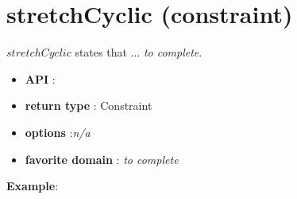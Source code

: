 \label{stretchcyclic}
\hypertarget{stretchcyclic}{}

\section{stretchCyclic (constraint)}\label{stretchcyclic:stretchcyclicconstraint}\hypertarget{stretchcyclic:stretchcyclicconstraint}{}
\(stretchCyclic\) states that ... \emph{to complete}.

\begin{itemize}
	\item \textbf{API} :
	\item \textbf{return type} : Constraint
	\item \textbf{options} :\emph{n/a}
	\item \textbf{favorite domain} : \emph{to complete}
\end{itemize}

\textbf{Example}:
\mylst{} 
